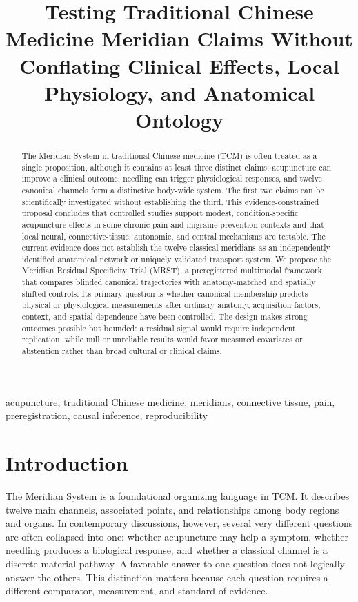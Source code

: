 \documentclass[conference]{IEEEtran}
\begin{document}
\title{Testing Traditional Chinese Medicine Meridian Claims Without Conflating Clinical Effects, Local Physiology, and Anatomical Ontology}

\author{}
\maketitle

\begin{abstract}
The Meridian System in traditional Chinese medicine (TCM) is often treated as a single proposition, although it contains at least three distinct claims: acupuncture can improve a clinical outcome, needling can trigger physiological responses, and twelve canonical channels form a distinctive body-wide system. The first two claims can be scientifically investigated without establishing the third. This evidence-constrained proposal concludes that controlled studies support modest, condition-specific acupuncture effects in some chronic-pain and migraine-prevention contexts and that local neural, connective-tissue, autonomic, and central mechanisms are testable. The current evidence does not establish the twelve classical meridians as an independently identified anatomical network or uniquely validated transport system. We propose the Meridian Residual Specificity Trial (MRST), a preregistered multimodal framework that compares blinded canonical trajectories with anatomy-matched and spatially shifted controls. Its primary question is whether canonical membership predicts physical or physiological measurements after ordinary anatomy, acquisition factors, context, and spatial dependence have been controlled. The design makes strong outcomes possible but bounded: a residual signal would require independent replication, while null or unreliable results would favor measured covariates or abstention rather than broad cultural or clinical claims.
\end{abstract}

\begin{IEEEkeywords}
acupuncture, traditional Chinese medicine, meridians, connective tissue, pain, preregistration, causal inference, reproducibility
\end{IEEEkeywords}

\section{Introduction}

The Meridian System is a foundational organizing language in TCM. It describes twelve main channels, associated points, and relationships among body regions and organs. In contemporary discussions, however, several very different questions are often collapsed into one: whether acupuncture may help a symptom, whether needling produces a biological response, and whether a classical channel is a discrete material pathway. A favorable answer to one question does not logically answer the others. This distinction matters because each question requires a different comparator, measurement, and standard of evidence.
\end{document}
